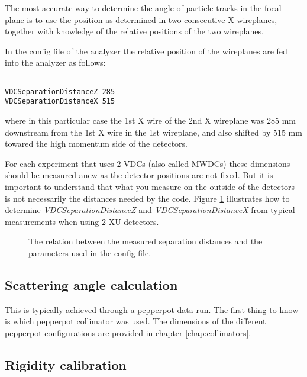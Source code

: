 \documentclass[11pt]{report}
\begin{document}
The most accurate way to determine the angle of particle tracks in the focal plane 
is to use the position as determined in two consecutive X wireplanes, together with knowledge
of the relative positions of the two wireplanes.

In the config file of the analyzer the relative position of the wireplanes are fed into the
analyzer as follows:
\begin{verbatim}

VDCSeparationDistanceZ 285
VDCSeparationDistanceX 515
\end{verbatim}
where in this particular case the 1st X wire of the 2nd X wireplane was 285 mm downstream
from the 1st X wire in the 1st wireplane, and also shifted by 515 mm towared the high momentum
side of the detectors.

For each experiment that uses 2 VDCs (also called MWDCs) these dimensions should be measured anew
as the detector positions are not fixed.   
But it is important to understand that what you measure on the outside of the detectors
is not necessarily the distances needed by the code.
Figure \ref{fig:vdcoffsets} illustrates how to determine
{\it VDCSeparationDistanceZ} and {\it VDCSeparationDistanceX} from typical measurements
when using 2 XU detectors.

\begin{figure}[hb!]
\centering
{}
\caption{The relation between the measured separation distances and the parameters used in the config file.}
\label{fig:vdcoffsets}
\end{figure}




\subsection{Scattering angle calculation}

This is typically achieved through a pepperpot data run. 
The first thing to know is which pepperpot collimator was used. The dimensions of the different pepperpot
configurations are provided in chapter \ref{chap:collimators}. 


\subsection{Rigidity calibration }\label{sec:rigiditycalibration}   %
\end{document}
